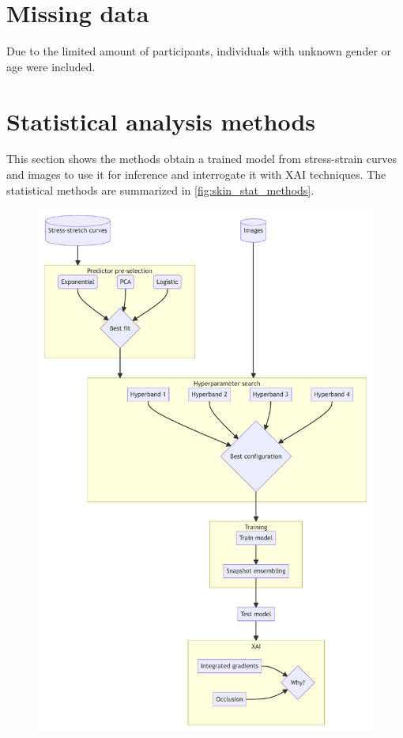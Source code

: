 \section{Missing data}
Due to the limited amount of participants, individuals with unknown gender or age were included.

\section{Statistical analysis methods}

This section shows the methods obtain a trained model from stress-strain curves and images to use it for inference and interrogate it with XAI techniques.
The statistical methods are summarized in \cref{fig:skin_stat_methods}.

\begin{figure}[p]
    \centering
    \includegraphics[height=\dimexpr\textheight-55.89pt\relax]{mermaid/skin_analysis.pdf}

\end{figure}
